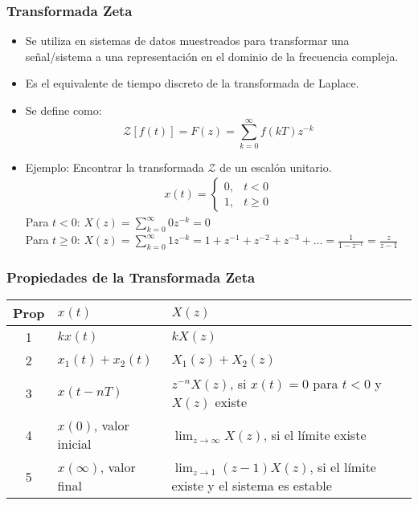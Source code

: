 \documentclass[aspectratio=169]{beamer}
\theoremstyle{definition}
\theoremstyle{plain}
\theoremstyle{remark}
\begin{document}
\begin{frame}[<+->]\frametitle{Transformada Zeta}
	\begin{itemize}
		\item Se utiliza en sistemas de datos muestreados para transformar una señal/sistema a una representación en el dominio de la frecuencia compleja.
		\item Es el equivalente de tiempo discreto de la transformada de Laplace.
		\item Se define como:
		\begin{equation*}
			\mathcal{Z}\left[ f(t) \right] = F(z) = \sum_{k=0}^{\infty}f(kT)z^{-k}
		\end{equation*}
		\item Ejemplo: Encontrar la transformada $\mathcal{Z}$ de un escalón unitario.
		\begin{align*}
			x(t) =
			\left\{
			\begin{array}{lr}
				0, & t < 0\\
				1, & t \geq 0
			\end{array}
			\right.
		\end{align*}
		\pause
		Para $t < 0$: $X(z) = \sum_{k=0}^{\infty} 0 z^{-k} = 0$\\
		\vspace*{3mm}
		\pause
		Para $t \geq 0$: $X(z) = \sum_{k=0}^{\infty} 1 z^{-k} = 1 + z^{-1} + z^{-2} + z^{-3} + \dots = \frac{1}{1-z^{-1}} = \frac{z}{z-1}$
	\end{itemize}
\end{frame}

\begin{frame}[c]\frametitle{Propiedades de la Transformada Zeta}
\begin{table}
	\begin{tabular}{cll}
		Prop & $x(t)$ & $X(z)$\\
		\hline
		1 & $kx(t)$ & $kX(z)$\\
		2 & $x_1(t) + x_2(t)$ & $X_1(z) + X_2(z)$\\
		3 & $x(t-nT)$ & $z^{-n}X(z)$, si $x(t) = 0$ para $t<0$ y $X(z)$ existe\\
		4 & $x(0)$, valor inicial & $\lim_{z\rightarrow \infty} X(z)$, si el límite existe\\
		5 & $x(\infty)$, valor final & $\lim_{z\rightarrow 1}(z-1) X(z)$, si el límite existe y el sistema es estable
	\end{tabular}
\end{table}
\end{frame}
\end{document}
